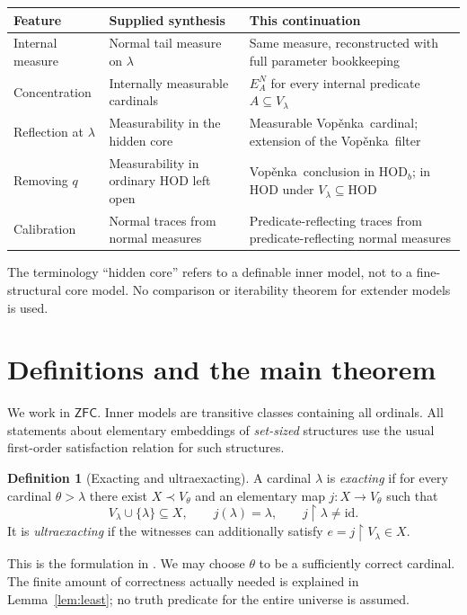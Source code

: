\documentclass[11pt,letterpaper]{article}
\theoremstyle{definition}
\newtheorem{definition}{Definition}[section]
\numberwithin{equation}{section}
\newcommand{\ZFC}{\mathsf{ZFC}}
\newcommand{\HOD}{\mathrm{HOD}}
\newcommand{\id}{\mathrm{id}}
\newcommand{\restr}{\mathbin{\upharpoonright}}
\newcommand{\Vop}{Vop\v{e}nka}
\begin{document}
\begin{center}
\small
\renewcommand{\arraystretch}{1.18}
\begin{tabularx}{\textwidth}{@{}P{.25\textwidth}YY@{}}
\toprule
\textbf{Feature}&\textbf{Supplied synthesis}&\textbf{This continuation}\\\midrule
Internal measure&Normal tail measure on $\lambda$&Same measure, reconstructed with full parameter bookkeeping\\
Concentration&Internally measurable cardinals&$E_A^N$ for every internal predicate $A\subseteq V_\lambda$\\
Reflection at $\lambda$&Measurability in the hidden core&Measurable \Vop\ cardinal; extension of the \Vop\ filter\\
Removing $q$&Measurability in ordinary HOD left open&\Vop\ conclusion in $\HOD_b$; in HOD under $V_\lambda\subseteq\HOD$\\
Calibration&Normal traces from normal measures&Predicate-reflecting traces from predicate-reflecting normal measures\\
\bottomrule
\end{tabularx}
\end{center}

The terminology ``hidden core'' refers to a definable inner model, not to a fine-structural core model. No comparison or iterability theorem for extender models is used.

\section{Definitions and the main theorem}\label{sec:main}

We work in $\ZFC$. Inner models are transitive classes containing all ordinals. All statements about elementary embeddings of \emph{set-sized} structures use the usual first-order satisfaction relation for such structures.

\begin{definition}[Exacting and ultraexacting]\label{def:ex}
A cardinal $\lambda$ is \emph{exacting} if for every cardinal $\theta>\lambda$ there exist $X\prec V_\theta$ and an elementary map $j:X\to V_\theta$ such that
\[
 V_\lambda\cup\{\lambda\}\subseteq X,\qquad j(\lambda)=\lambda,
 \qquad j\restr\lambda\ne\id.
\]
It is \emph{ultraexacting} if the witnesses can additionally satisfy
$e=j\restr V_\lambda\in X$.
\end{definition}

This is the formulation in \cite[\S2]{abgl}. We may choose $\theta$ to be a sufficiently correct cardinal. The finite amount of correctness actually needed is explained in Lemma~\ref{lem:least}; no truth predicate for the entire universe is assumed.
\end{document}
